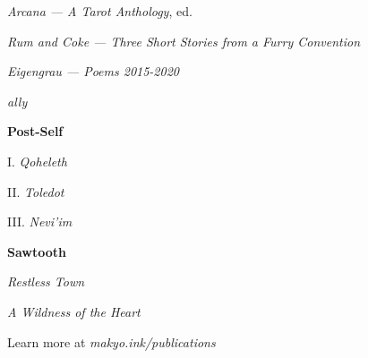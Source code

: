 \singlespacing
\thispagestyle{empty}
\begin{center}
    \TitleFamily

    \vspace{2ex}

    \emph{Arcana — A Tarot Anthology}, ed.

    \vspace{1ex}

    \emph{Rum and Coke — Three Short Stories from a Furry Convention}

    \vspace{1ex}

    \emph{Eigengrau — Poems 2015-2020}

    \vspace{1ex}

    \emph{ally}

    \vspace{2ex}
    
    \textbf{Post-Self}

    I. \emph{Qoheleth}

    II. \emph{Toledot}

    III. \emph{Nevi'im}

    \vspace{2ex}

    \textbf{Sawtooth}

    \emph{Restless Town}

    \emph{A Wildness of the Heart}

    \vspace{2em}

    Learn more at \emph{makyo.ink/publications}
\end{center}
\vfill
\singlespacing
